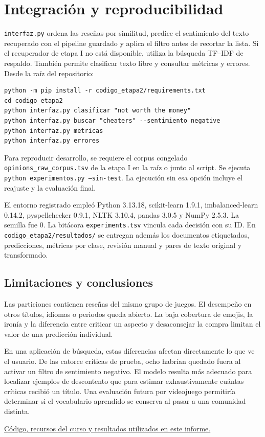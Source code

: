 \documentclass[11pt,letterpaper]{article}
\begin{document}
\section{Integración y reproducibilidad}
\texttt{interfaz.py} ordena las reseñas por similitud, predice el sentimiento del texto recuperado con el pipeline guardado y aplica el filtro antes de recortar la lista. Si el recuperador de etapa I no está disponible, utiliza la búsqueda TF--IDF de respaldo. También permite clasificar texto libre y consultar métricas y errores. Desde la raíz del repositorio:
\begin{verbatim}
python -m pip install -r codigo_etapa2/requirements.txt
cd codigo_etapa2
python interfaz.py clasificar "not worth the money"
python interfaz.py buscar "cheaters" --sentimiento negative
python interfaz.py metricas
python interfaz.py errores
\end{verbatim}
Para reproducir desarrollo, se requiere el corpus congelado \texttt{opinions\_raw\_corpus.tsv} de la etapa I en la raíz o junto al script. Se ejecuta \texttt{python experimentos.py --sin-test}. La ejecución sin esa opción incluye el reajuste y la evaluación final.

El entorno registrado empleó Python 3.13.18, scikit-learn 1.9.1, imbalanced-learn 0.14.2, pyspellchecker 0.9.1, NLTK 3.10.4, pandas 3.0.5 y NumPy 2.5.3. La semilla fue 0. La bitácora \texttt{experiments.tsv} vincula cada decisión con su ID. En \texttt{codigo\_etapa2/resultados/} se entregan además los documentos etiquetados, predicciones, métricas por clase, revisión manual y pares de texto original y transformado.

\subsection*{Limitaciones y conclusiones} Las particiones contienen reseñas del mismo grupo de juegos. El desempeño en otros títulos, idiomas o periodos queda abierto. La baja cobertura de emojis, la ironía y la diferencia entre criticar un aspecto y desaconsejar la compra limitan el valor de una predicción individual.

En una aplicación de búsqueda, estas diferencias afectan directamente lo que ve el usuario. De las catorce críticas de prueba, ocho habrían quedado fuera al activar un filtro de sentimiento negativo. El modelo resulta más adecuado para localizar ejemplos de descontento que para estimar exhaustivamente cuántas críticas recibió un título. Una evaluación futura por videojuego permitiría determinar si el vocabulario aprendido se conserva al pasar a una comunidad distinta.

\href{https://github.com/UlisesACC/proyecto-PLN/tree/5892c241c1bb37cb0870d7d21bf578d4c98a78a5/codigo_etapa2}{Código, recursos del curso y resultados utilizados en este informe.}
\end{document}
